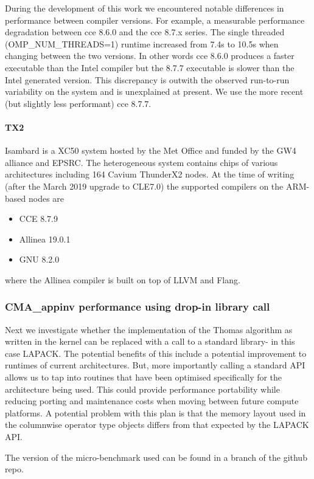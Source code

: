 During the development of this work we encountered notable differences in performance between compiler versions.
For example, a measurable performance degradation between cce 8.6.0 and the cce 8.7.x series.
The single threaded (OMP\_NUM\_THREADS=1) runtime increased from 7.4s to 10.5s when changing between the two versions.
In other words cce 8.6.0 produces a faster executable than the Intel compiler but the 8.7.7 executable is slower than the Intel generated version.
This discrepancy is outwith the observed run-to-run variability on the system and is unexplained at present.
We use the more recent (but slightly less performant) cce 8.7.7.

\paragraph{TX2}
Isambard is a XC50 system hosted by the Met Office and funded by the GW4 alliance and EPSRC.
The heterogeneous system contains chips of various architectures including 164 Cavium ThunderX2 nodes.
At the time of writing (after the March 2019 upgrade to CLE7.0) the supported compilers on the ARM-based nodes are
\begin{itemize}
\item CCE 8.7.9
\item Allinea 19.0.1
\item GNU 8.2.0
\end{itemize}
where the Allinea compiler is built on top of LLVM and Flang.



\subsubsection{CMA\_appinv performance using drop-in library call}
Next we investigate whether the implementation of the Thomas algorithm as written in the kernel can be replaced with a call to a standard library- in this case LAPACK.
The potential benefits of this include a potential improvement to runtimes of current architectures.
But, more importantly calling a standard API allows us to tap into routines that have been optimised specifically for the architecture being used.
This could provide performance portability while reducing porting and maintenance costs when moving between future compute platforms.
A potential problem with this plan is that the memory layout used in the columnwise operator type objects differs from that expected by the LAPACK API.

The version of the micro-benchmark used can be found in a branch of the github repo.

